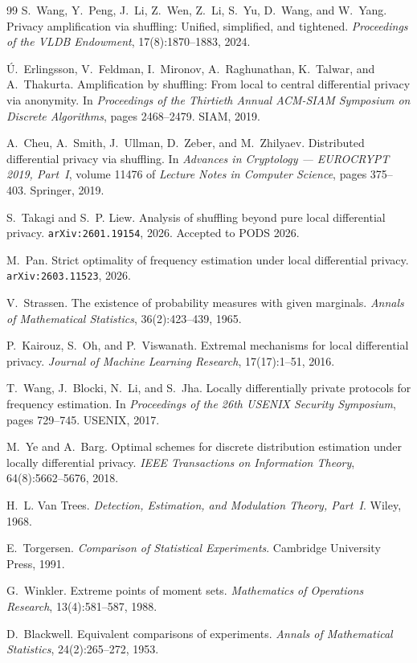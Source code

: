 \documentclass[11pt]{amsart}
\theoremstyle{definition}
\begin{document}
\begin{thebibliography}{99}
S.~Wang, Y.~Peng, J.~Li, Z.~Wen, Z.~Li, S.~Yu, D.~Wang, and W.~Yang.
\newblock Privacy amplification via shuffling: Unified, simplified, and tightened.
\newblock \emph{Proceedings of the VLDB Endowment}, 17(8):1870--1883, 2024.

\'U.~Erlingsson, V.~Feldman, I.~Mironov, A.~Raghunathan, K.~Talwar, and A.~Thakurta.
\newblock Amplification by shuffling: From local to central differential privacy via anonymity.
\newblock In \emph{Proceedings of the Thirtieth Annual ACM-SIAM Symposium on Discrete Algorithms}, pages 2468--2479. SIAM, 2019.

A.~Cheu, A.~Smith, J.~Ullman, D.~Zeber, and M.~Zhilyaev.
\newblock Distributed differential privacy via shuffling.
\newblock In \emph{Advances in Cryptology --- EUROCRYPT 2019, Part~I}, volume 11476 of \emph{Lecture Notes in Computer Science}, pages 375--403. Springer, 2019.

S.~Takagi and S.~P. Liew.
\newblock Analysis of shuffling beyond pure local differential privacy.
\newblock \texttt{arXiv:2601.19154}, 2026. Accepted to PODS 2026.

M.~Pan.
\newblock Strict optimality of frequency estimation under local differential privacy.
\newblock \texttt{arXiv:2603.11523}, 2026.

V.~Strassen.
\newblock The existence of probability measures with given marginals.
\newblock \emph{Annals of Mathematical Statistics}, 36(2):423--439, 1965.

P.~Kairouz, S.~Oh, and P.~Viswanath.
\newblock Extremal mechanisms for local differential privacy.
\newblock \emph{Journal of Machine Learning Research}, 17(17):1--51, 2016.

T.~Wang, J.~Blocki, N.~Li, and S.~Jha.
\newblock Locally differentially private protocols for frequency estimation.
\newblock In \emph{Proceedings of the 26th USENIX Security Symposium}, pages 729--745. USENIX, 2017.

M.~Ye and A.~Barg.
\newblock Optimal schemes for discrete distribution estimation under locally differential privacy.
\newblock \emph{IEEE Transactions on Information Theory}, 64(8):5662--5676, 2018.

H.~L. Van Trees.
\newblock \emph{Detection, Estimation, and Modulation Theory, Part~I}.
\newblock Wiley, 1968.

E.~Torgersen.
\newblock \emph{Comparison of Statistical Experiments}.
\newblock Cambridge University Press, 1991.

G.~Winkler.
\newblock Extreme points of moment sets.
\newblock \emph{Mathematics of Operations Research}, 13(4):581--587, 1988.

D.~Blackwell.
\newblock Equivalent comparisons of experiments.
\newblock \emph{Annals of Mathematical Statistics}, 24(2):265--272, 1953.

\end{thebibliography}
\end{document}
